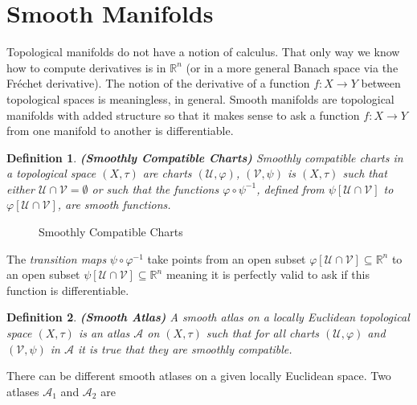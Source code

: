 \documentclass{article}
\theoremstyle{plain}
\theoremstyle{normal}
\newtheorem{definition}{Definition}[section]
\begin{document}
    \section{Smooth Manifolds}
        Topological manifolds do not have a notion of calculus. That only way
        we know how to compute derivatives is in $\mathbb{R}^{n}$
        (or in a more general Banach space via the Fr\'{e}chet derivative).
        The notion of the derivative of a function
        $f:X\rightarrow{Y}$ between topological spaces is meaningless, in
        general. Smooth manifolds are topological manifolds with added structure
        so that it makes sense to ask a function
        $f:X\rightarrow{Y}$ from one manifold to another is differentiable.
        \begin{definition}{\textbf{(Smoothly Compatible Charts)}}
            Smoothly compatible charts in a topological space
            $(X,\tau)$ are charts $(\mathcal{U},\varphi)$,
            $(\mathcal{V},\psi)$ is $(X,\tau)$ such that either
            $\mathcal{U}\cap\mathcal{V}=\emptyset$ or such that the functions
            $\varphi\circ\psi^{-1}$, defined from
            $\psi[\mathcal{U}\cap\mathcal{V}]$ to
            $\varphi[\mathcal{U}\cap\mathcal{V}]$, are smooth functions.
        \end{definition}
        \begin{figure}
            \centering
            \caption{Smoothly Compatible Charts}
            \label{fig:smoothly_overlapping_charts}
        \end{figure}
        The \textit{transition maps} $\psi\circ\varphi^{-1}$ take points from
        an open subset
        $\varphi[\mathcal{U}\cap\mathcal{V}]\subseteq\mathbb{R}^{n}$ to an
        open subset $\psi[\mathcal{U}\cap\mathcal{V}]\subseteq\mathbb{R}^{n}$
        meaning it is perfectly valid to ask if this function is differentiable.
        \begin{definition}{\textbf{(Smooth Atlas)}}
            A smooth atlas on a locally Euclidean topological space
            $(X,\tau)$ is an atlas $\mathcal{A}$ on $(X,\tau)$ such that for
            all charts $(\mathcal{U},\varphi)$ and $(\mathcal{V},\psi)$ in
            $\mathcal{A}$ it is true that they are smoothly compatible.
        \end{definition}
        There can be different smooth atlases on a given locally Euclidean
        space. Two atlases $\mathcal{A}_{1}$ and $\mathcal{A}_{2}$ are
\end{document}
